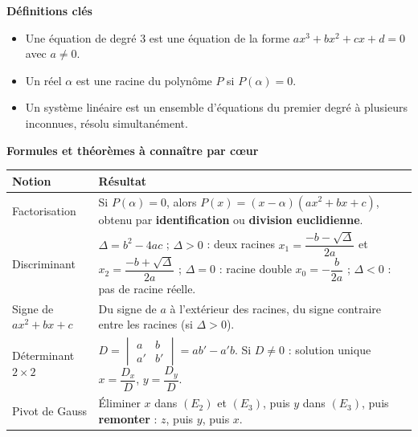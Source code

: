 \documentclass[11pt]{article}
\newcommand{\cle}[1]{{\popxbold\color{popdark}#1}}
\begin{document}
\begin{aretenir}
\textbf{Définitions clés}
\begin{itemize}
  \item Une \cle{équation de degré 3} est une équation de la forme $ax^3+bx^2+cx+d=0$ avec $a\neq 0$.
  \item Un réel $\alpha$ est une \cle{racine} du polynôme $P$ si $P(\alpha)=0$.
  \item Un \cle{système linéaire} est un ensemble d'équations du premier degré à plusieurs inconnues, résolu simultanément.
\end{itemize}

\textbf{Formules et théorèmes à connaître par cœur}
\begin{center}
\begin{tabularx}{\linewidth}{|l|X|}
\hline
\rowcolor{popblueL} \textbf{Notion} & \textbf{Résultat} \\
\hline
Factorisation & Si $P(\alpha)=0$, alors $P(x)=(x-\alpha)(ax^2+bx+c)$, obtenu par \textbf{identification} ou \textbf{division euclidienne}. \\
\hline
Discriminant & $\Delta=b^2-4ac$ ; $\Delta>0$ : deux racines $x_{1}=\dfrac{-b-\sqrt{\Delta}}{2a}$ et $x_{2}=\dfrac{-b+\sqrt{\Delta}}{2a}$ ; $\Delta=0$ : racine double $x_0=-\dfrac{b}{2a}$ ; $\Delta<0$ : pas de racine réelle. \\
\hline
Signe de $ax^2+bx+c$ & Du signe de $a$ à l'extérieur des racines, du signe contraire entre les racines (si $\Delta>0$). \\
\hline
Déterminant $2\times2$ & $D=\begin{vmatrix} a & b \\ a' & b' \end{vmatrix}=ab'-a'b$. Si $D\neq0$ : solution unique $x=\dfrac{D_x}{D}$, $y=\dfrac{D_y}{D}$. \\
\hline
Pivot de Gauss & Éliminer $x$ dans $(E_2)$ et $(E_3)$, puis $y$ dans $(E_3)$, puis \textbf{remonter} : $z$, puis $y$, puis $x$. \\
\hline
\end{tabularx}
\end{center}


\end{aretenir}
\end{document}
